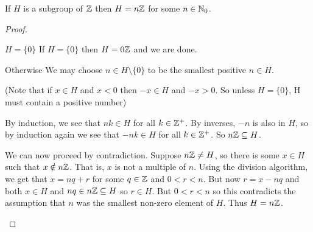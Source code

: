 \documentclass[../main.tex]{subfiles}
\begin{document}
\begin{proposition}
  If $H$ is a subgroup of $\mathbb{Z}$ then $H = n\mathbb{Z}$ for some $n \in \mathbb{N}_0$.
\end{proposition}
\begin{proof}
  \begin{proofcases}
    \begin{case}{$H = \{0\}$}
      If $H = \{0\}$ then $H = 0\mathbb{Z}$ and we are done.
    \end{case}
    \begin{case}{Otherwise}
      We may choose $n \in H \setminus \{0\}$ to be the smallest positive $n \in H$.

      (Note that if $x \in H$ and $x < 0$ then $-x \in H$ and $-x > 0$. So unless $H = \{0\}$, H must contain a positive number)

      By induction, we see that $nk \in H$ for all $k \in \mathbb{Z}^{+}$.
      By inverses, $-n$ is also in $H$, so by induction again we see that $-nk \in H$ for all $k \in \mathbb{Z}^{+}$.
      So $n\mathbb{Z} \subseteq H$.

      We can now proceed by contradiction.
      Suppose $n\mathbb{Z} \neq H$, so there is some $x \in H$ such that $x \notin n\mathbb{Z}$.
      That is, $x$ is not a multiple of $n$.
      Using the division algorithm, we get that $x = nq + r$ for some $q \in \mathbb{Z}$ and $0 < r < n$.
      But now $r = x - nq$ and both $x \in H$ and $nq \in n\mathbb{Z} \subseteq H$ so $r \in H$.
      But $0 < r < n$ so this contradicts the assumption that $n$ was the smallest non-zero element of $H$.
      Thus $H = n\mathbb{Z}$.
    \end{case}
  \end{proofcases}
\end{proof}
\end{document}
